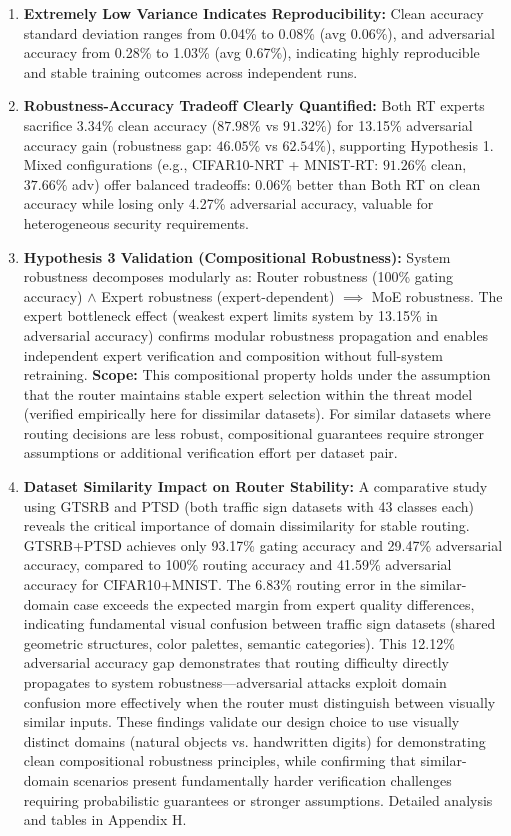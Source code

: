 \documentclass[11pt,a4paper]{article}
\begin{document}
\begin{enumerate}
    \item \textbf{Extremely Low Variance Indicates Reproducibility:} Clean accuracy standard deviation ranges from 0.04\% to 0.08\% (avg 0.06\%), and adversarial accuracy from 0.28\% to 1.03\% (avg 0.67\%), indicating highly reproducible and stable training outcomes across independent runs.

    \item \textbf{Robustness-Accuracy Tradeoff Clearly Quantified:} Both RT experts sacrifice 3.34\% clean accuracy ($87.98\%$ vs $91.32\%$) for 13.15\% adversarial accuracy gain (robustness gap: $46.05\%$ vs $62.54\%$), supporting Hypothesis 1. Mixed configurations (e.g., CIFAR10-NRT + MNIST-RT: $91.26\%$ clean, $37.66\%$ adv) offer balanced tradeoffs: 0.06\% better than Both RT on clean accuracy while losing only 4.27\% adversarial accuracy, valuable for heterogeneous security requirements.

    \item \textbf{Hypothesis 3 Validation (Compositional Robustness):} System robustness decomposes modularly as: Router robustness (100\% gating accuracy) $\land$ Expert robustness (expert-dependent) $\implies$ MoE robustness. The expert bottleneck effect (weakest expert limits system by 13.15\% in adversarial accuracy) confirms modular robustness propagation and enables independent expert verification and composition without full-system retraining. \textbf{Scope:} This compositional property holds under the assumption that the router maintains stable expert selection within the threat model (verified empirically here for dissimilar datasets). For similar datasets where routing decisions are less robust, compositional guarantees require stronger assumptions or additional verification effort per dataset pair.

    \item \textbf{Dataset Similarity Impact on Router Stability:} A comparative study using GTSRB and PTSD (both traffic sign datasets with 43 classes each) reveals the critical importance of domain dissimilarity for stable routing. GTSRB+PTSD achieves only 93.17\% gating accuracy and 29.47\% adversarial accuracy, compared to 100\% routing accuracy and 41.59\% adversarial accuracy for CIFAR10+MNIST. The 6.83\% routing error in the similar-domain case exceeds the expected margin from expert quality differences, indicating fundamental visual confusion between traffic sign datasets (shared geometric structures, color palettes, semantic categories). This 12.12\% adversarial accuracy gap demonstrates that routing difficulty directly propagates to system robustness—adversarial attacks exploit domain confusion more effectively when the router must distinguish between visually similar inputs. These findings validate our design choice to use visually distinct domains (natural objects vs. handwritten digits) for demonstrating clean compositional robustness principles, while confirming that similar-domain scenarios present fundamentally harder verification challenges requiring probabilistic guarantees or stronger assumptions. Detailed analysis and tables in Appendix H.
\end{enumerate}
\end{document}
